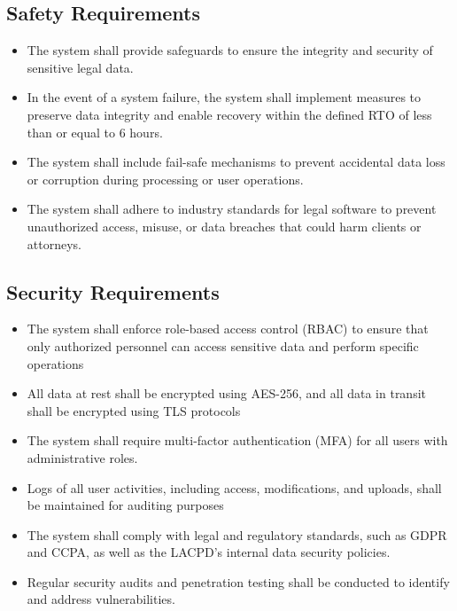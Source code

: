 \documentclass[12pt]{article}
\begin{document}
\subsection{Safety Requirements}
\begin{itemize}
  \item  The system shall provide safeguards to ensure the integrity and security of sensitive legal
 data.
  \item In the event of a system failure, the system shall implement measures to preserve data
 integrity and enable recovery within the defined RTO of less than or equal to 6 hours.
  \item  The system shall include fail-safe mechanisms to prevent accidental data loss or corruption
 during processing or user operations.
\item The system shall adhere to industry standards for legal software to prevent unauthorized
 access, misuse, or data breaches that could harm clients or attorneys.
\end{itemize}

\subsection{Security Requirements}
\begin{itemize}
  \item The system shall enforce role-based access control (RBAC) to ensure that only authorized
 personnel can access sensitive data and perform specific operations
  \item All data at rest shall be encrypted using AES-256, and all data in transit shall be encrypted
 using TLS protocols
\item The system shall require multi-factor authentication (MFA) for all users with administrative
 roles.
\item  Logs of all user activities, including access, modifications, and uploads, shall be maintained
 for auditing purposes
\item The system shall comply with legal and regulatory standards, such as GDPR and CCPA, as
 well as the LACPD's internal data security policies.
\item   Regular security audits and penetration testing shall be conducted to identify and address
 vulnerabilities.
\end{itemize}
\end{document}
